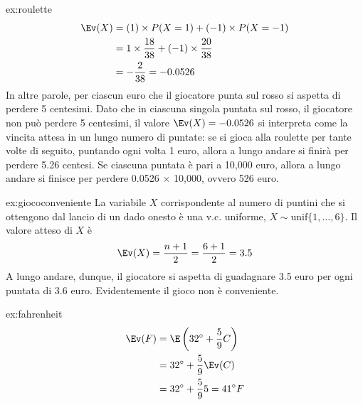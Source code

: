 
\begin{sol}{ex:roulette}
\begin{align}
\Ev(X) &= (1) \times P(X=1) + (-1) \times P(X=-1) \notag\\
&= 1 \times \frac{18}{38} + (-1) \times \frac{20}{38} \notag\\
&= -\frac{2}{38} = -0.0526\notag
\end{align}
In altre parole, per ciascun euro che il giocatore punta sul rosso si aspetta di perdere 5 centesimi.
Dato che in ciascuna singola puntata sul rosso, il giocatore non può perdere 5 centesimi, il valore $\Ev(X) = -0.0526$ si interpreta come la vincita attesa in un lungo numero di puntate: se si gioca alla roulette per tante volte di seguito, puntando ogni volta 1 euro, allora a lungo andare si finirà per perdere 5.26 centesi.
Se  ciascuna puntata è pari a 10,000 euro, allora a lungo andare si finisce per perdere 0.0526 $\times$ 10,000, ovvero 526 euro.
\end{sol}


\begin{sol}{ex:giococonveniente}
 La variabile $X$ corrispondente al numero di puntini che si ottengono dal lancio di un dado onesto è una v.c. uniforme, $X \sim \text{unif}\{1, \dots, 6\}$.
 Il valore atteso di $X$ è
$$
\Ev(X) = \frac{n+1}{2} = \frac{6+1}{2} = 3.5
$$
A lungo andare, dunque, il giocatore si aspetta di guadagnare 3.5 euro per ogni puntata di 3.6 euro. Evidentemente il gioco non è conveniente.
\end{sol}


\begin{sol}{ex:fahrenheit}
\begin{align}
\Ev(F) &= \E\left(32^\circ + \frac{5}{9}C\right)\notag\\
&= 32^\circ + \frac{5}{9}\Ev(C)\notag\\
&= 32^\circ + \frac{5}{9} 5 = 41^\circ F\notag
\end{align}
\end{sol}


